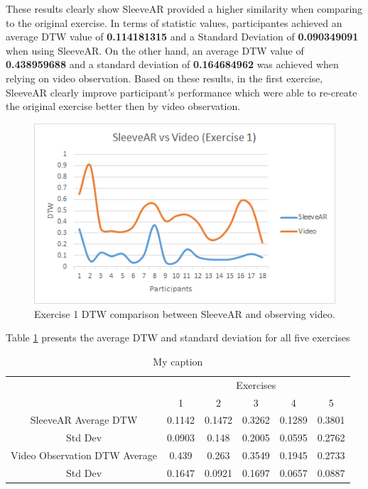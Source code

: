 These results clearly show SleeveAR provided a higher similarity when comparing to the original exercise. 
In terms of statistic values, participantes achieved an average \ac{DTW} value of \textbf{0.114181315} and a Standard Deviation of \textbf{0.090349091} when using SleeveAR.
On the other hand, an average \ac{DTW} value of \textbf{0.438959688} and a standard deviation of \textbf{0.164684962} was achieved when relying on video observation. 
Based on these results, in the first exercise, SleeveAR clearly improve participant's performance which were able to re-create the original exercise better then by video observation.



\begin{figure}[t!]
    \centering
    \includegraphics{imgs/results/sleevearVSvideoEx1.png}
    \caption{Exercise 1 DTW comparison between SleeveAR and observing video.}
    \label{fig:sleevearVSvideoEx1}
\end{figure}


Table \ref{table:dtwavg} presents the average DTW and standard deviation for all five exercises 


\begin{table}
\centering
\begin{tabular}{c|c|c|c|c|c|}
\cline{2-6}
\multicolumn{1}{l|}{}                               & \multicolumn{5}{c|}{Exercises}             \\ \cline{2-6} 
                                                    & 1      & 2      & 3      & 4      & 5      \\ \hline
\multicolumn{1}{|c|}{SleeveAR Average DTW}          & 0.1142 & 0.1472 & 0.3262 & 0.1289 & 0.3801 \\ \hline
\multicolumn{1}{|c|}{Std Dev}                       & 0.0903 & 0.148  & 0.2005 & 0.0595 & 0.2762 \\ \hline
\multicolumn{1}{|c|}{Video Observation DTW Average} & 0.439  & 0.263  & 0.3549 & 0.1945 & 0.2733 \\ \hline
\multicolumn{1}{|c|}{Std Dev}                       & 0.1647 & 0.0921 & 0.1697 & 0.0657 & 0.0887 \\ \hline
\end{tabular}
\caption{My caption}
\label{table:dtwavg}
\end{table}

